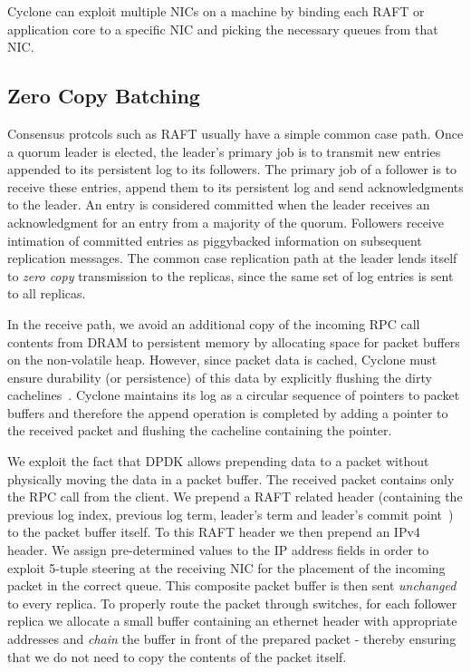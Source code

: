 \documentclass[10pt, preprint]{sigplanconf}
\begin{document}
Cyclone can exploit multiple NICs on a machine by binding each RAFT or
application core to a specific NIC and picking the necessary queues from that
NIC.

\subsection{Zero Copy Batching}
Consensus protcols such as RAFT usually have a simple common case path. Once a
quorum leader is elected, the leader's primary job is to transmit new entries
appended to its persistent log to its followers. The primary job of a follower
is to receive these entries, append them to its persistent log and send
acknowledgments to the leader. An entry is considered committed when the leader
receives an acknowledgment for an entry from a majority of the quorum. Followers
receive intimation of committed entries as piggybacked information on subsequent
replication messages. The common case replication path at the leader lends
itself to \emph{zero copy} transmission to the replicas, since the same set of
log entries is sent to all replicas.

In the receive path, we avoid an additional copy of the incoming RPC call
contents from DRAM to persistent memory by allocating space for packet buffers
on the non-volatile heap. However, since packet data is cached, Cyclone must
ensure durability (or persistence) of this data by explicitly flushing the dirty
cachelines~\cite{pmfs}. Cyclone maintains its log as a circular sequence of
pointers to packet buffers and therefore the append operation is completed by
adding a pointer to the received packet and flushing the cacheline containing
the pointer.

We exploit the fact that DPDK allows prepending data to a packet
without physically moving the data in a packet buffer. The received packet
contains only the RPC call from the client. We prepend a RAFT related header
(containing the previous log index, previous log term, leader's term and
leader's commit point~\cite{raft}) to the packet buffer itself. To this RAFT header 
we then prepend an IPv4 header. We assign pre-determined values to the
IP address fields in order to exploit 5-tuple steering at the receiving NIC for 
the placement of the incoming packet in the correct queue.
This composite packet buffer is then sent \emph{unchanged} to every replica.
To properly route the packet through switches, for each follower replica we
allocate a small buffer containing an ethernet header with appropriate addresses
and \emph{chain} the buffer in front of the prepared packet - thereby ensuring
that we do not need to copy the contents of the packet itself.
\end{document}

